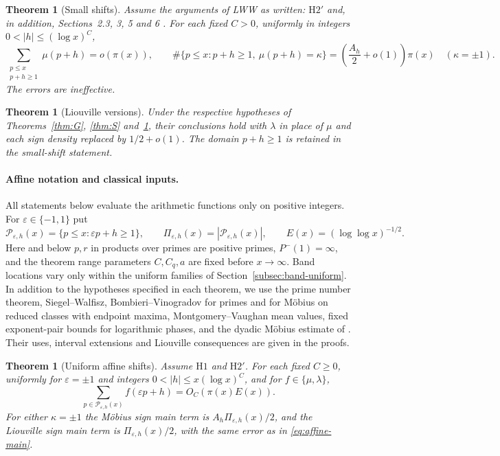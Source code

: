\documentclass[11pt]{article}
\newtheorem{theorem}{Theorem}[section]
\newtheorem{theoremA}{Theorem}
\newtheorem{theoremH}{Theorem}
\theoremstyle{definition}
\newcommand{\LWW}[1]{\cite[#1]{LWW}}
\theoremstyle{remark}
\numberwithin{equation}{section}
\begin{document}
\begin{theoremH}[Small shifts]\label{thm:H}
Assume the arguments of LWW as written: $\mathrm H2'$ and, in addition,
Sections~2.3, 3, 5 and 6 \LWW{pp.~6--14, 39--47}.
For each fixed $C>0$, uniformly in integers $0<|h|\le(\log x)^C$,
\begin{equation}\label{eq:H}
 \sum_{\substack{p\le x\\p+h\ge1}}\mu(p+h)=o(\pi(x)),\qquad
 \#\{p\le x:p+h\ge1,\ \mu(p+h)=\kappa\}
 =\left(\frac{A_h}2+o(1)\right)\pi(x)
 \quad(\kappa=\pm1).
\end{equation}
The errors are ineffective.
\end{theoremH}

\begin{theorem}[Liouville versions]\label{thm:lambda}
Under the respective hypotheses of Theorems~\ref{thm:G}, \ref{thm:S}
and~\ref{thm:H}, their conclusions hold with $\lambda$ in place of
$\mu$ and each sign density replaced by $1/2+o(1)$.
The domain $p+h\ge1$ is retained in the small-shift statement.
\end{theorem}

\paragraph{Affine notation and classical inputs.}
All statements below evaluate the arithmetic functions only on positive
integers. For $\varepsilon\in\{-1,1\}$ put
\begin{equation}\label{eq:eligible}
 \mathcal P_{\varepsilon,h}(x)=\{p\le x:\varepsilon p+h\ge1\},\qquad
 \Pi_{\varepsilon,h}(x)=|\mathcal P_{\varepsilon,h}(x)|,\qquad
 E(x)=(\log\log x)^{-1/2}.
\end{equation}
Here and below $p,r$ in products over primes are positive primes,
$P^-(1)=\infty$, and the theorem range parameters $C,C_q,a$ are fixed
before $x\to\infty$. Band locations vary only within the uniform families
of Section~\ref{subsec:band-uniform}.
In addition to the hypotheses specified in each theorem, we use the
prime number theorem, Siegel--Walfisz, Bombieri--Vinogradov for primes
and for M\"obius on reduced classes with endpoint maxima,
Montgomery--Vaughan mean values, fixed exponent-pair bounds for
logarithmic phases, and the dyadic M\"obius estimate of
\cite[Lemma~3.9(ii)]{MSTT}. Their uses, interval extensions and
Liouville consequences are given in the proofs.

\begin{theoremA}[Uniform affine shifts]\label{thm:affine}
Assume $\mathrm H1$ and $\mathrm H2'$. For each fixed $C\ge0$,
uniformly for $\varepsilon=\pm1$ and integers
$0<|h|\le x(\log x)^C$, and for $f\in\{\mu,\lambda\}$,
\begin{equation}\label{eq:affine-main}
 \sum_{p\in\mathcal P_{\varepsilon,h}(x)}f(\varepsilon p+h)
       =O_C(\pi(x)E(x)).
\end{equation}
For either $\kappa=\pm1$ the M\"obius sign main term is
$A_h\Pi_{\varepsilon,h}(x)/2$, and the Liouville sign main term is
$\Pi_{\varepsilon,h}(x)/2$, with the same error as in
\eqref{eq:affine-main}.
\end{theoremA}
\end{document}
